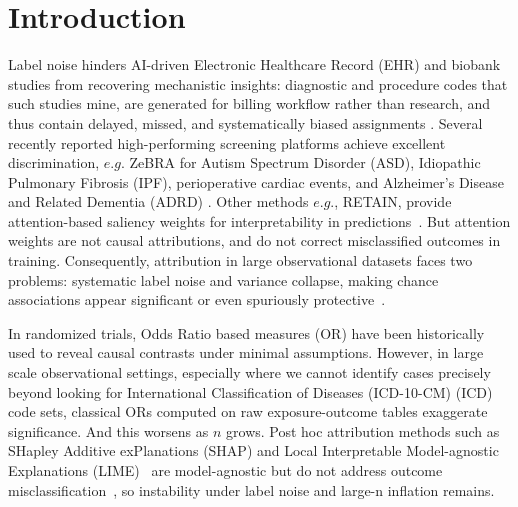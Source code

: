 \documentclass[pdflatex,sn-mathphys-num]{sn-jnl}%
\def\zcor{ZeBRA\xspace}
\theoremstyle{thmstyleone}%
\theoremstyle{thmstyletwo}%
\theoremstyle{thmstylethree}%
\begin{document}
\section{Introduction} 
Label noise hinders AI-driven Electronic Healthcare Record (EHR) and biobank studies from recovering mechanistic insights: diagnostic and procedure codes that such studies  mine, are generated for billing workflow rather than research, and thus contain delayed, missed, and systematically biased assignments \cite{halpern2016electronic}.  Several recently reported  high-performing screening platforms  achieve excellent discrimination, $e.g.$ \zcor for Autism Spectrum Disorder (ASD), Idiopathic Pulmonary Fibrosis (IPF), perioperative cardiac events, and Alzheimer's Disease and Related Dementia (ADRD) \cite{ASDzed,IPFzed,JAHAzed,ADRDzed}. Other methods $e.g.$, RETAIN, provide attention-based saliency weights for interpretability in predictions~\cite{choi2016retain}. But attention weights are not causal attributions, and do not correct misclassified outcomes in training. Consequently, attribution in large observational datasets faces two problems: systematic label noise and variance collapse, making chance associations appear significant or even spuriously protective~\cite{greenland1988sensitivity}.

In randomized trials, Odds Ratio based measures (OR) have been historically used to  reveal causal contrasts under minimal assumptions. However, in large scale observational settings, especially where we cannot identify cases precisely beyond looking for  International Classification of Diseases (ICD-10-CM) (ICD) code sets,  classical ORs computed on raw exposure-outcome tables exaggerate significance. And this worsens as $n$ grows. Post hoc attribution methods such as SHapley Additive exPlanations (SHAP) and Local Interpretable Model-agnostic Explanations (LIME)~\cite{lundberg17shap,Ribeiro2016WhyTrust} are model-agnostic but do not address outcome misclassification~\cite{slack2020fooling}, so instability under label noise and large-n inflation remains.
\end{document}
